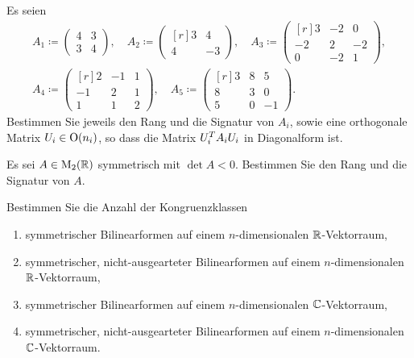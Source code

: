 \documentclass[a4paper, 10pt]{scrartcl}
\begin{document}
\begin{question}
  Es seien
  \begin{gather*}
              A_1
    \coloneqq \begin{pmatrix}
                4 & 3 \\
                3 & 4
              \end{pmatrix},
    \quad    
              A_2
    \coloneqq \begin{pmatrix*}[r]
                3 &   4 \\
                4 &  -3
              \end{pmatrix*},
    \quad     A_3
    \coloneqq \begin{pmatrix*}[r]
                 3  & -2  &  0  \\
                -2  &  2  & -2  \\
                 0  & -2  &  1
              \end{pmatrix*},
    \\
              A_4
    \coloneqq \begin{pmatrix*}[r]
                 2  & -1  & 1 \\
                -1  &  2  & 1 \\
                 1  &  1  & 2
              \end{pmatrix*},
    \quad
              A_5
    \coloneqq \begin{pmatrix*}[r]
                3 & 8 &  5  \\
                8 & 3 &  0  \\
                5 & 0 & -1
              \end{pmatrix*}.
  \end{gather*}
  Bestimmen Sie jeweils den Rang und die Signatur von $A_i$, sowie eine orthogonale Matrix $U_i \in \operatorname{O}(n_i)$, so dass die Matrix $U_i^T A_i U_i$ in Diagonalform ist.
\end{question}


\begin{question}
  Es sei $A \in \operatorname{M}_{2}(\mathbb{R})$ symmetrisch mit $\det A < 0$.
  Bestimmen Sie den Rang und die Signatur von $A$.
\end{question}


\begin{question}
  Bestimmen Sie die Anzahl der Kongruenzklassen
  \begin{enumerate}
    \item
      symmetrischer Bilinearformen auf einem $n$-dimensionalen $\mathbb{R}$-Vektorraum,
    \item
      symmetrischer, nicht-ausgearteter Bilinearformen auf einem $n$-dimensionalen $\mathbb{R}$-Vektorraum,
    \item
      symmetrischer Bilinearformen auf einem $n$-dimensionalen $\mathbb{C}$-Vektorraum,
    \item
      symmetrischer, nicht-ausgearteter Bilinearformen auf einem $n$-dimensionalen $\mathbb{C}$-Vektorraum.
  \end{enumerate}
\end{question}
\end{document}
